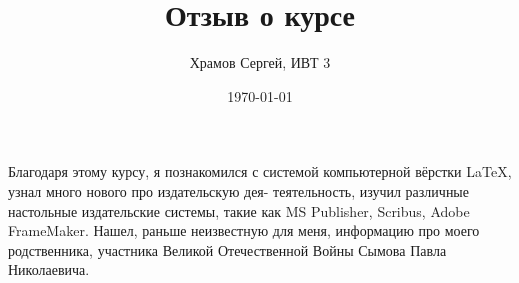 \documentclass[a4paper,12pt]{article} %
\author{Храмов Сергей, ИВТ 3}
\title{Отзыв о курсе{}}
\date{\today}
\begin{document}
\maketitle
Благодаря этому курсу, я познакомился с системой компьютерной вёрстки \LaTeX,  узнал много нового про издательскую дея-
теятельность, изучил различные настольные издательские системы, такие как MS Publisher, Scribus, Adobe FrameMaker. Нашел, раньше неизвестную для меня, информацию про моего родственника, участника Великой Отечественной Войны Сымова Павла Николаевича. 
\end{document}
